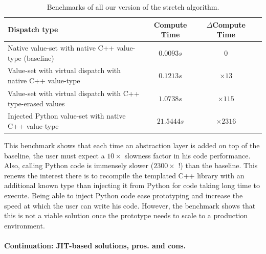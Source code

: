 \begin{table}[htbp]
  \footnotesize
  \centering
  \begin{tabular}{l|ccc}
    \toprule
    Dispatch type                                               &
    Compute Time                                                &
    \(\Delta{}\)Compute Time
    \\ \midrule Native value-set with native C++ value-type (baseline)
                                                                & \(0.0093s\) & \(0\) \\
    Value-set with virtual dispatch with native C++ value-type  &
    \(0.1213s\)                                                 &
    \(\times 13\)
    \\
    Value-set with virtual dispatch with C++ type-erased values &
    \(1.0738s\)                                                 &
    \(\times 115\)
    \\
    Injected Python value-set with native C++ value-type        &
    \(21.5444s\)                                                &
    \(\times 2316\)
    \\
    \bottomrule
  \end{tabular}
  \caption[]{Benchmarks of all our version of the stretch algorithm.}
  \label{summary:table:static.dynamic.perfs}
\end{table}

This benchmark shows that each time an abstraction layer is added on top of the baseline, the user must expect a
\(10\times\) slowness factor in his code performance. Also, calling Python code is immensely slower (\(2300\times\) !)
than the baseline. This renews the interest there is to recompile the templated C++ library with an additional known
type than injecting it from Python for code taking long time to execute. Being able to inject Python code ease
prototyping and increase the speed at which the user can write his code. However, the benchmark shows that this is not a
viable solution once the prototype needs to scale to a production environment.

\paragraph{Continuation: JIT-based solutions, pros. and cons.}


